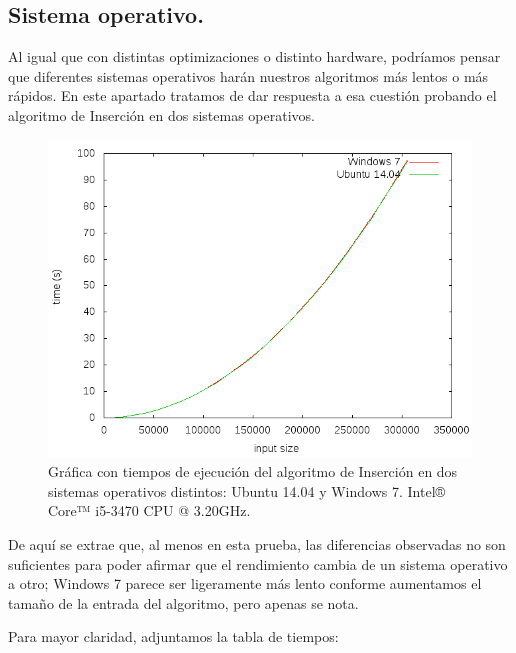 \documentclass[11pt,a4paper]{article}
\begin{document}
\newpage

		\subsection{Sistema operativo.}

			\par
			Al igual que con distintas optimizaciones o distinto hardware, podríamos pensar que diferentes sistemas operativos harán nuestros algoritmos más lentos o más rápidos. En este apartado tratamos de dar respuesta a esa cuestión probando el algoritmo de Inserción en dos sistemas operativos.

			\begin{figure}[h]

				\centering
				\includegraphics[width=1\textwidth]{insercion_2so.png}
				\caption{Gráfica con tiempos de ejecución del algoritmo de Inserción en dos sistemas operativos distintos: Ubuntu 14.04 y Windows 7. Intel® Core™ i5-3470 CPU @ 3.20GHz.}

			\end{figure}

			\par
			De aquí se extrae que, al menos en esta prueba, las diferencias observadas no son suficientes para poder afirmar que el rendimiento cambia de un sistema operativo a otro; Windows 7 parece ser ligeramente más lento conforme aumentamos el tamaño de la entrada del algoritmo, pero apenas se nota.

\newpage

			\par
			Para mayor claridad, adjuntamos la tabla de tiempos:
\end{document}
